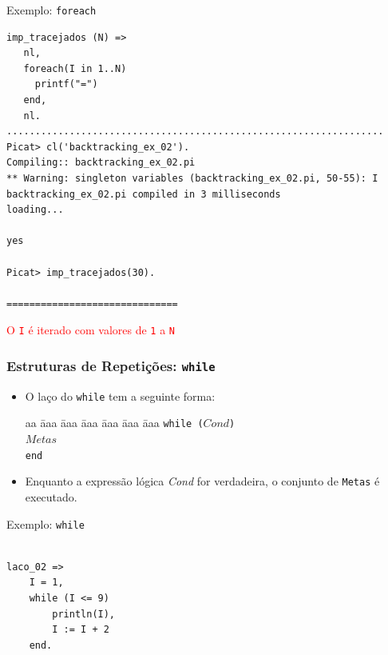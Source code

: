 \begin{frame}[fragile]

\begin{block}{Exemplo: \texttt{foreach} }
     
\begin{lstlisting}[frame=single]
 imp_tracejados (N) =>
   nl,
   foreach(I in 1..N)
     printf("=")
   end,
   nl.   
..................................................................  
Picat> cl('backtracking_ex_02').
Compiling:: backtracking_ex_02.pi
** Warning: singleton variables (backtracking_ex_02.pi, 50-55): I
backtracking_ex_02.pi compiled in 3 milliseconds
loading...

yes

Picat> imp_tracejados(30).

==============================
\end{lstlisting}
        
\end{block}

\textcolor{red}{O \texttt{I} é iterado com valores de \texttt{1} a \texttt{N}}
\end{frame}    


\begin{frame}[fragile]
\frametitle{Estruturas de Repetições: \texttt{while}}


\begin{itemize}
        \item O laço do \texttt{while} tem a seguinte forma:
        
        \begin{tabbing}
            aa \= aaa \= aaa \= aaa \= aaa \= aaa \= aaa \kill
            \> \texttt{while ($Cond$)} \\
            \> \> $Metas$  \\
            \>  \texttt{end}
        \end{tabbing} 
        
        \item Enquanto a expressão lógica \emph{Cond} for verdadeira, o conjunto de \texttt{Metas} é executado.
        
\end{itemize}
\end{frame}    


\begin{frame}[fragile]

\begin{block}{Exemplo: \texttt{while} }
     
\begin{lstlisting}[frame=single]
  
laco_02 =>  
    I = 1,  
    while (I <= 9)  
        println(I),  
        I := I + 2  
    end.  
\end{lstlisting}
        
\end{block}
\end{frame}    

